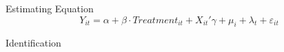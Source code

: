 \begin{frame}{Estimating Equation}
\begin{equation*}
Y_{it} = \alpha + \beta \cdot Treatment_{it} + X_{it}'\gamma + \mu_i + \lambda_t + \varepsilon_{it}
\end{equation*}
\end{frame}

\begin{frame}{Identification}
\end{frame}

